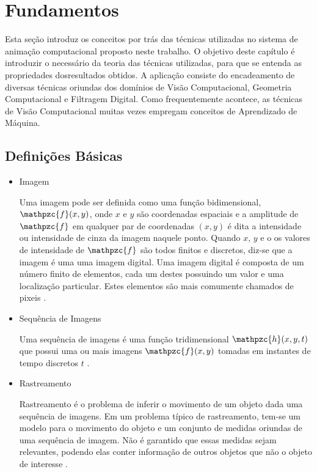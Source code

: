 \chapter{Fundamentos\label{chap:FundamentacaoMatematica}}

Esta seção introduz os conceitos por trás das técnicas utilizadas no sistema
de animação computacional proposto neste trabalho. O objetivo deste capítulo 
é introduzir o necessário da teoria das técnicas utilizadas, 
para que se entenda as propriedades dosresultados obtidos. A aplicação 
consiste do encadeamento de diversas técnicas oriundas dos domínios de 
Visão Computacional, Geometria Computacional e Filtragem Digital. Como frequentemente
acontece, as técnicas de Visão Computacional muitas vezes empregam conceitos de 
Aprendizado de Máquina. 


\section{Definições Básicas}

\begin{itemize}
\item Imagem

Uma imagem pode ser definida como uma função bidimensional, $\mathpzc{f}(x,y)$,
onde $x$ e $y$ são coordenadas espaciais e a amplitude de $\mathpzc{f}$ em
qualquer par de coordenadas $(x,y)$ é dita a intensidade ou intensidade de cinza
da imagem naquele ponto. Quando $x$, $y$ e o os valores de intensidade de
$\mathpzc{f}$ são todos finitos e discretos, diz-se que a imagem é uma uma
imagem digital. Uma imagem digital é composta de um número finito de elementos,
cada um destes possuindo um valor e uma localização particular. Estes elementos
são mais comumente chamados de pixeis \cite{gonzalesDigitalImageProc}.

\item Sequência de Imagens

Uma sequência de imagens é uma função tridimensional $\mathpzc{h}(x,y,t)$ que
possui uma ou mais imagens $\mathpzc{f}(x,y)$ tomadas em instantes de tempo
discretos $t$ \cite{def:imageSequence}.

\item Rastreamento

Rastreamento é o problema de inferir o movimento de um objeto dada uma sequência
de imagens. Em um problema típico de rastreamento, tem-se um modelo para o
movimento do objeto e um conjunto de medidas oriundas de uma sequência de
imagem. Não é garantido que essas medidas sejam relevantes, podendo elas conter
informação de outros objetos que não o objeto de interesse
\cite{computer-vision-modern-approach-forsithy}.

\end{itemize}


